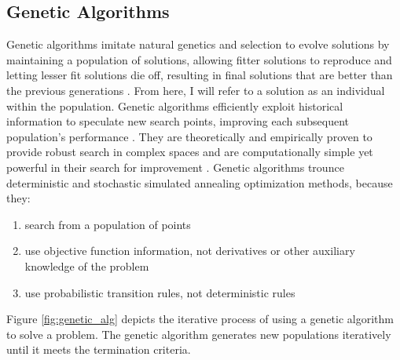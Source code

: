 \subsection{Genetic Algorithms}
\label{sec:genetic_alg}
Genetic algorithms imitate natural genetics and selection to evolve solutions 
by maintaining a population of solutions, allowing fitter solutions to reproduce
and letting lesser fit solutions die off, resulting in final solutions that are 
better than the previous generations \cite{renner_genetic_2003}. 
From here, I will refer to a solution as an individual within the population. 
Genetic algorithms efficiently exploit historical information to speculate new
 search points, improving each subsequent population's performance 
\cite{goldberg_genetic_1989}. 
They are theoretically and empirically proven to provide robust 
search in complex spaces and are computationally simple yet powerful 
in their search for improvement \cite{goldberg_genetic_1989}. 
Genetic algorithms trounce deterministic and stochastic simulated 
annealing optimization methods, because they:
\begin{enumerate}
    \item search from a population of points
    \item use objective function information, not derivatives or other 
    auxiliary knowledge of the problem
    \item use probabilistic transition rules, not deterministic rules
\end{enumerate}
Figure \ref{fig:genetic_alg} depicts the iterative process of using a genetic algorithm
to solve a problem. 
The genetic algorithm generates new populations iteratively until it meets the termination 
criteria. 
